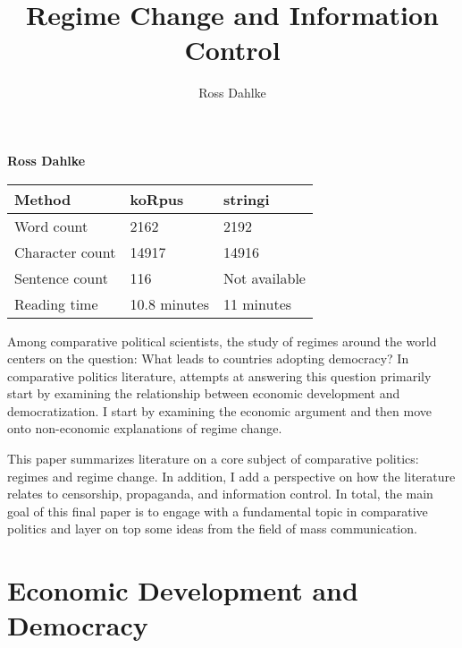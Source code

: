 \documentclass[12pt,]{article}
\title{Regime Change and Information Control  }
\author{\Large Ross Dahlke\vspace{0.05in} \newline\normalsize\emph{}  }
\date{}
\newcommand*{\authorfont}{\fontfamily{phv}\selectfont}
\begin{document}
	
%

{%
\setlength{\parindent}{0pt}
\thispagestyle{plain}
{\fontsize{18}{20}\selectfont\raggedright 
\maketitle  %

}

{
   \vskip 13.5pt\relax \normalsize\fontsize{11}{12} 
\textbf{\authorfont Ross Dahlke} \hskip 15pt \emph{\small }   

}

}






\vskip -8.5pt



\noindent \doublespacing 

\begin{longtable}[]{@{}lll@{}}
\toprule
Method & koRpus & stringi\tabularnewline
\midrule
\endhead
Word count & 2162 & 2192\tabularnewline
Character count & 14917 & 14916\tabularnewline
Sentence count & 116 & Not available\tabularnewline
Reading time & 10.8 minutes & 11 minutes\tabularnewline
\bottomrule
\end{longtable}

Among comparative political scientists, the study of regimes around the
world centers on the question: What leads to countries adopting
democracy? In comparative politics literature, attempts at answering
this question primarily start by examining the relationship between
economic development and democratization. I start by examining the
economic argument and then move onto non-economic explanations of regime
change.

This paper summarizes literature on a core subject of comparative
politics: regimes and regime change. In addition, I add a perspective on
how the literature relates to censorship, propaganda, and information
control. In total, the main goal of this final paper is to engage with a
fundamental topic in comparative politics and layer on top some ideas
from the field of mass communication.

\hypertarget{economic-development-and-democracy}{%
\section{Economic Development and
Democracy}\label{economic-development-and-democracy}}
\end{document}
